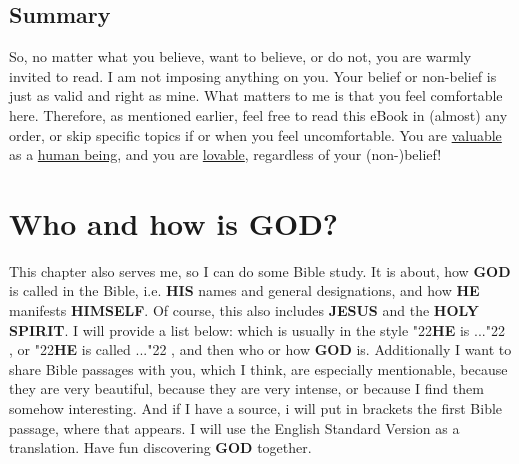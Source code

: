 \documentclass[10pt,a5paper]{article}
\newcommand{\God}[0]{\textbf{GOD}}
\newcommand{\He}[0]{\textbf{HE}}
\newcommand{\Himself}[0]{\textbf{HIMSELF}}
\newcommand{\His}[0]{\textbf{HIS}}
\newcommand{\Holy}[0]{\textbf{HOLY}}
\newcommand{\Jesus}[0]{\textbf{JESUS}}
\newcommand{\Spirit}[0]{\textbf{SPIRIT}}
\newcommand{\q}[1]{\char"22{#1}\char"22 }
\begin{document}
	\subsection{Summary}
		So,
		no matter what you believe,
		want to believe,
		or do not,
		you are warmly invited to read.
		I am not imposing anything on you.
		Your belief or non-belief is just as valid and right as mine.
		What matters to me is that you feel comfortable here.
		Therefore,
		as mentioned earlier,
		feel free to read this eBook in (almost) any order,
		or skip specific topics if or when you feel uncomfortable.
		You are \underline{valuable} as a \underline{human being},
		and you are \underline{lovable},
		regardless of your (non-)belief!
		
	\newpage
	\section{Who and how is {\God}?}
		This chapter also serves me,
		so I can do some Bible study.
		It is about,
		how {\God} is called in the Bible,
		i.e. {\His} names and general designations,
		and how {\He} manifests {\Himself}.
		Of course,
		this also includes {\Jesus} and the {\Holy} {\Spirit}.
		I will provide a list below:
		which is usually in the style \q{{\He} is ...},
		or \q{{\He} is called ...},
		and then who or how {\God} is.
		Additionally I want to share Bible passages with you,
		which I think,
		are especially mentionable,
		because they are very beautiful,
		because they are very intense,
		or because I find them somehow interesting.
		And if I have a source,
		i will put in brackets the first Bible passage,
		where that appears.
		I will use the English Standard Version as a translation.
		Have fun discovering {\God} together.
\end{document}
